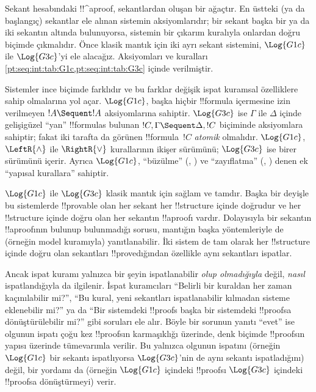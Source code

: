 \documentclass[../../../include/open-logic-section]{subfiles}
\begin{document}
Sekant hesabındaki !!^a{proof}, sekantlardan oluşan bir ağaçtır. En üstteki
(ya da başlangıç) sekantlar ele alınan sistemin aksiyomlarıdır; bir sekant
başka bir ya da iki sekantın altında bulunuyorsa, sistemin bir çıkarım
kuralıyla onlardan doğru biçimde çıkmalıdır. Önce klasik mantık için iki ayrı
sekant sistemini, $\Log{G1c}$ ile $\Log{G3c}$'yi ele alacağız. Aksiyomları ve
kuralları \cref{pt:seq:int:tab:G1c,pt:seq:int:tab:G3c} içinde verilmiştir.




Sistemler ince biçimde farklıdır ve bu farklar değişik ispat kuramsal
özelliklere sahip olmalarına yol açar. $\Log{G1c}$, başka hiçbir !!{formula}
içermesine izin verilmeyen $!A \Sequent !A$ aksiyomlarına sahiptir.
$\Log{G3c}$ ise $\Gamma$ ile $\Delta$ içinde gelişigüzel ``yan'' !!{formula}s
bulunan $!C,\Gamma \Sequent \Delta,!C$ biçiminde aksiyomlara sahiptir; fakat
iki tarafta da görünen !!{formula}~$!C$ \emph{atomik} olmalıdır. $\Log{G1c}$,
$\LeftR{\land}$ ile $\RightR{\lor}$ kurallarının ikişer sürümünü;
$\Log{G3c}$ ise birer sürümünü içerir. Ayrıca $\Log{G1c}$, ``büzülme''
(\LeftR{\Contraction}, \RightR{\Contraction}) ve ``zayıflatma''
(\LeftR{\Weakening}, \RightR{\Weakening}) denen ek ``yapısal kurallara''
sahiptir.

$\Log{G1c}$ ile $\Log{G3c}$ klasik mantık için sağlam ve tamdır. Başka bir
deyişle bu sistemlerde !!{provable} olan her sekant her !!{structure} içinde
doğrudur ve her !!{structure} içinde doğru olan her sekantın !!a{proof}{}ı
vardır. Dolayısıyla bir sekantın !!a{proof}{}ının bulunup bulunmadığı sorusu,
mantığın başka yöntemleriyle de (örneğin model kuramıyla) yanıtlanabilir. İki
sistem de tam olarak her !!{structure} içinde doğru olan sekantları !!{prove}{}dığından
özellikle aynı sekantları ispatlar.

Ancak ispat kuramı yalnızca bir şeyin ispatlanabilir \emph{olup olmadığıyla}
değil, \emph{nasıl} ispatlandığıyla da ilgilenir. İspat kuramcıları ``Belirli
bir kuraldan her zaman kaçınılabilir mi?'', ``Bu kural, yeni sekantları
ispatlanabilir kılmadan sisteme eklenebilir mi?'' ya da ``Bir sistemdeki
!!{proof}s başka bir sistemdeki !!{proof}s{}a dönüştürülebilir mi?'' gibi
soruları ele alır. Böyle bir sorunun yanıtı ``evet'' ise olgunun ispatı çoğu
kez !!{proof}s{}ın karmaşıklığı üzerinde, denk biçimde !!{proof}s{}ın yapısı
üzerinde tümevarımla verilir. Bu yalnızca olgunun ispatını (örneğin
$\Log{G1c}$ bir sekantı ispatlıyorsa $\Log{G3c}$'nin de aynı sekantı
ispatladığını) değil, bir yordamı da (örneğin $\Log{G1c}$ içindeki !!{proof}s{}ı
$\Log{G3c}$ içindeki !!{proof}s{}a dönüştürmeyi) verir.
\end{document}
